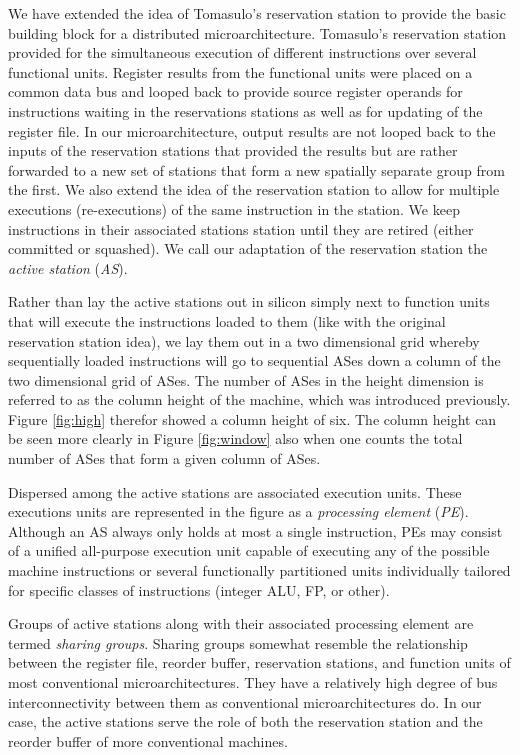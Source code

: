 \documentclass[10pt,dvips]{article}
\begin{document}
We have extended the idea of Tomasulo's reservation
station \cite{Tom67} to provide the basic building block for a distributed
microarchitecture.  Tomasulo's reservation station provided for the
simultaneous execution of different instructions over several
functional units.  
Register results from the functional units were placed on
a common data bus and looped back to provide source register operands 
for instructions waiting in the reservations stations as well as
for updating of the register file.  In our microarchitecture,
output results are not looped back to the inputs of the reservation
stations
that provided the results but are rather forwarded to a new set of
stations that form a new spatially separate group from the first.  
We
also extend the idea of the reservation station to allow for multiple
executions (re-executions) of the same instruction in the station.  We
keep instructions in their associated stations station until they are
retired (either committed or squashed).  We call our adaptation of the
reservation station the \textit{active station} (\textit{AS}).

Rather than lay the active stations out in silicon simply next to
function units that will execute the instructions loaded to them
(like with the original reservation station idea),
we lay them out in a two dimensional grid whereby sequentially
loaded instructions will go to sequential ASes down a column of
the two dimensional grid of ASes. 
The number of ASes in the height dimension is referred to
as the column height of the machine, which was introduced
previously.
Figure \ref{fig:high} therefor showed a column height of six.
The column height can be seen more clearly in 
Figure \ref{fig:window} also when one counts the total
number of ASes that form a given column of ASes.

Dispersed among the active stations are associated execution
units.  These executions units are represented in the figure as
a \textit{processing element} (\textit{PE}).  
Although an AS always only holds at most a single instruction,
PEs may consist of a unified all-purpose execution unit capable of
executing any of the possible machine instructions or
several functionally partitioned units individually tailored
for specific classes of instructions (integer ALU, FP, or other).

Groups of active stations along with their associated processing
element
are termed \textit{sharing groups}.  Sharing groups somewhat resemble
the relationship between the register file, reorder buffer,
reservation stations, and function units of most conventional
microarchitectures.  They have a relatively high degree of bus
interconnectivity between them as conventional microarchitectures do.
In our case, the active stations serve the role of both the
reservation station and the reorder buffer of more conventional
machines.
\end{document}

